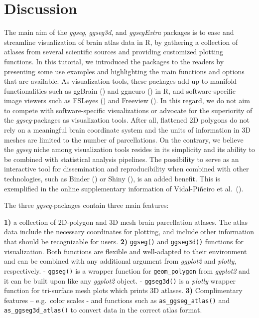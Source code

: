 \documentclass[fleqn,10pt]{wlpeerj} %
\begin{document}
\hypertarget{discussion}{%
\section{Discussion}\label{discussion}}

The main aim of the \emph{ggseg}, \emph{ggseg3d}, and \emph{ggsegExtra} packages is to ease and streamline visualization of brain atlas data in R, by gathering a collection of atlases from several scientific sources and providing customized plotting functions.
In this tutorial, we introduced the packages to the readers by presenting some use examples and highlighting the main functions and options that are available.
As visualization tools, these packages add up to manifold functionalities such as ggBrain (\citet{ggBrain}) and ggneuro (\citet{ggneuro}) in R, and software-specific image viewers such as FSLeyes (\citet{fsleyes}) and Freeview (\citet{dale_99}).
In this regard, we do not aim to compete with software-specific visualizations or advocate for the superiority of the \emph{ggseg}-packages as visualization tools.
After all, flattened 2D polygons do not rely on a meaningful brain coordinate system and the units of information in 3D meshes are limited to the number of parcellations.
On the contrary, we believe the \emph{ggseg} niche among visualization tools resides in its simplicity and its ability to be combined with statistical analysis pipelines.
The possibility to serve as an interactive tool for dissemination and reproducibility when combined with other technologies, such as Binder (\citet{binder}) or Shiny (\citet{shiny}), is an added benefit.
This is exemplified in the online supplementary information of Vidal-Piñeiro et al.~(\citeyearpar{vidal_2019}).

The three \emph{ggseg}-packages contain three main features:

\textbf{1)} a collection of 2D-polygon and 3D mesh brain parcellation atlases. The atlas data include the necessary coordinates for plotting, and include other information that should be recognizable for users.
\textbf{2)} \texttt{ggseg()} and \texttt{ggseg3d()} functions for visualization. Both functions are flexible and well-adapted to their environment and can be combined with any additional argument from \emph{ggplot2} and \emph{plotly}, respectively.
- \texttt{ggseg()} is a wrapper function for \texttt{geom\_polygon} from \emph{ggplot2} and it can be built upon like any \emph{ggplot2} object.
- \texttt{ggseg3d()} is a \emph{plotly} wrapper function for tri-surface mesh plots which prints 3D atlases.
\textbf{3)} Complimentary features -- e.g.~color scales - and functions such as \texttt{as\_ggseg\_atlas()} and \texttt{as\_ggseg3d\_atlas()} to convert data in the correct atlas format.
\end{document}
